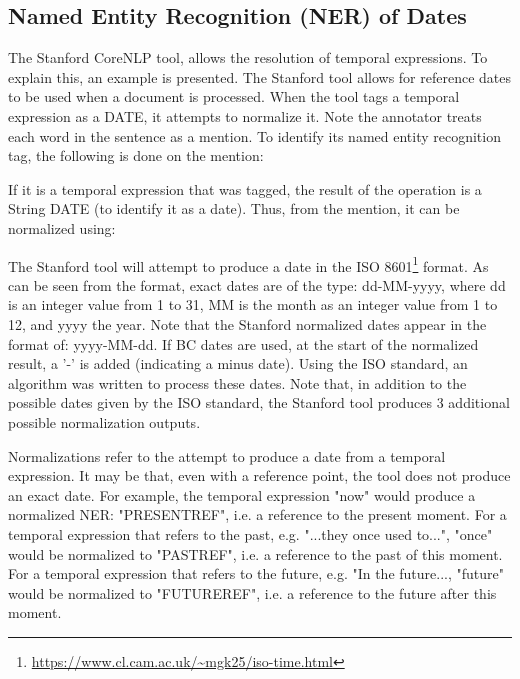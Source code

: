 \subsection{Named Entity Recognition (NER) of Dates}
\par The Stanford CoreNLP tool, allows the resolution of temporal expressions. To explain this, an example is presented. The Stanford tool allows for reference dates to be used when a document is processed. When the tool tags a temporal expression as a DATE, it attempts to normalize it. Note the annotator treats each word in the sentence as a mention. To identify its named entity recognition tag, the following is done on the mention: \par
{}
If it is a temporal expression that was tagged, the result of the operation is a String DATE (to identify it as a date). Thus, from the mention, it can be normalized using: \par
{}
The Stanford tool will attempt to produce a date in the ISO 8601\footnote{\url{https://www.cl.cam.ac.uk/~mgk25/iso-time.html}} format. As can be seen from the format, exact dates are of the type: dd-MM-yyyy, where dd is an integer value from 1 to 31, MM is the month as an integer value from 1 to 12, and yyyy the year. Note that the Stanford normalized dates appear in the format of: yyyy-MM-dd. If BC dates are used, at the start of the normalized result, a '-' is added (indicating a minus date). Using the ISO standard, an algorithm was written to process these dates. Note that, in addition to the possible dates given by the ISO standard, the Stanford tool produces 3 additional possible normalization outputs.

\par Normalizations refer to the attempt to produce a date from a temporal expression. It may be that, even with a reference point, the tool does not produce an exact date. For example, the temporal expression "now" would produce a normalized NER: "PRESENT\textunderscore REF", i.e. a reference to the present moment. For a temporal expression that refers to the past, e.g. "...they once used to...", "once" would be normalized to "PAST\textunderscore REF", i.e. a reference to the past of this moment. For a temporal expression that refers to the future, e.g. "In the future..., "future" would be normalized to "FUTURE\textunderscore REF", i.e. a reference to the future after this moment. 


